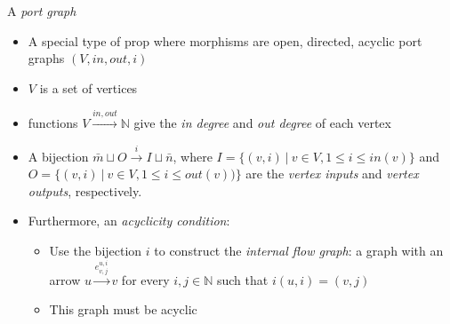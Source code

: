 A \emph{port graph}

\begin{itemize}
    \item A special type of prop where morphisms are open, directed, acyclic port graphs $(V, in, out, i)$
    \item $V$ is a set of vertices
    \item functions $V \xrightarrow{in, out} \mathbb{N}$ give the \emph{in degree} and \emph{out degree} of each vertex
    \item A bijection $\bar m \sqcup O \xrightarrow{i} I \sqcup \bar n$, where $I = \{(v,i)\ |\ v \in V, 1 \leq i \leq in(v)\}$ and $O=\{(v,i)\ |\ v \in V, 1 \leq i \leq out(v))\}$ are the \emph{vertex inputs} and \emph{vertex outputs}, respectively.
    \item Furthermore, an \emph{acyclicity condition}:
          \begin{itemize}
            \item Use the bijection $i$ to construct the \emph{internal flow graph}: a graph with an arrow $u \xrightarrow{e^{u,i}_{v,j}} v$ for every $i,j \in \mathbb{N}$ such that $i(u,i)=(v,j)$
            \item This graph must be acyclic
          \end{itemize}
  \end{itemize}

